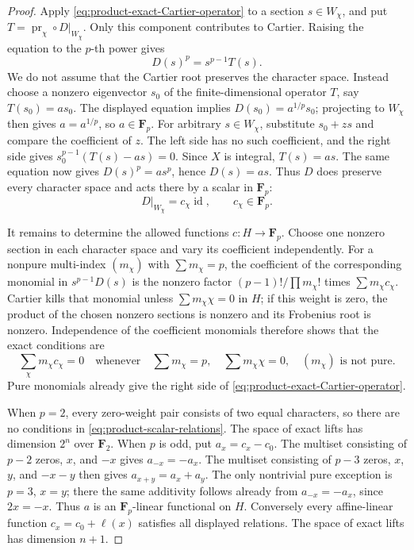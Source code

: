 \begin{proof}
Apply \eqref{eq:product-exact-Cartier-operator} to a
section $s\in W_\chi$, and put
$T=\operatorname{pr}_\chi\circ D|_{W_\chi}$.
Only this component contributes to Cartier.  Raising
the equation to the $p$-th power gives
\[
 D(s)^p=s^{p-1}T(s).
\]
We do not assume that the Cartier root preserves the
character space.  Instead choose a nonzero eigenvector
$s_0$ of the finite-dimensional operator $T$, say
$T(s_0)=a s_0$.  The displayed equation implies
$D(s_0)=a^{1/p}s_0$; projecting to $W_\chi$ then gives
$a=a^{1/p}$, so $a\in\mathbf F_p$.
For arbitrary $s\in W_\chi$, substitute $s_0+z s$
and compare the coefficient of $z$.
The left side has no such coefficient, and the right
side gives $s_0^{p-1}(T(s)-a s)=0$.
Since $X$ is integral, $T(s)=a s$.
The same equation now gives $D(s)^p=a s^p$, hence
$D(s)=a s$.  Thus $D$ does preserve every character
space and acts there by a scalar in $\mathbf F_p$:
\begin{equation}\label{eq:product-character-scalar}
 D|_{W_\chi}=c_\chi\operatorname{id},\qquad c_\chi\in\mathbf F_p.
\end{equation}

It remains to determine the allowed functions
$c:H\to\mathbf F_p$.
Choose one nonzero section in each character space
and vary its coefficient independently.
For a nonpure multi-index $(m_\chi)$ with
$\sum m_\chi=p$, the coefficient of the corresponding
monomial in $s^{p-1}D(s)$ is the nonzero factor
$(p-1)!/\prod m_\chi!$ times
$\sum m_\chi c_\chi$.
Cartier kills that monomial unless
$\sum m_\chi\chi=0$ in $H$; if this weight is zero,
the product of the chosen nonzero sections is nonzero
and its Frobenius root is nonzero.
Independence of the coefficient monomials therefore
shows that the exact conditions are
\begin{equation}\label{eq:product-scalar-relations}
 \sum_\chi m_\chi c_\chi=0
 \quad\text{whenever}\quad
 \sum m_\chi=p,\quad\sum m_\chi\chi=0,
 \quad(m_\chi)\text{ is not pure}.
\end{equation}
Pure monomials already give the right side of
\eqref{eq:product-exact-Cartier-operator}.

When $p=2$, every zero-weight pair consists of two
equal characters, so there are no conditions in
\eqref{eq:product-scalar-relations}.  The space of
exact lifts has dimension $2^n$ over $\mathbf F_2$.
When $p$ is odd, put $a_x=c_x-c_0$.
The multiset consisting of $p-2$ zeros, $x$, and $-x$
gives $a_{-x}=-a_x$.
The multiset consisting of $p-3$ zeros, $x$, $y$, and
$-x-y$ then gives $a_{x+y}=a_x+a_y$.
The only nontrivial pure exception is $p=3$, $x=y$;
there the same additivity follows already from
$a_{-x}=-a_x$, since $2x=-x$.
Thus $a$ is an $\mathbf F_p$-linear functional on $H$.
Conversely every affine-linear function
$c_x=c_0+\ell(x)$ satisfies all displayed relations.
The space of exact lifts has dimension $n+1$.


\end{proof}
